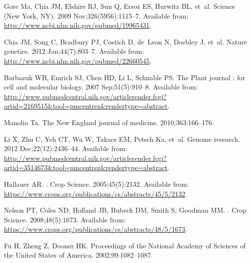 \documentclass[10pt,letterpaper]{article}
\begin{document}
\begin{thebibliography}{}
Gore Ma, Chia JM, Elshire RJ, Sun Q, Ersoz ES, Hurwitz BL, et~al.
\newblock Science (New York, NY). 2009 Nov;326(5956):1115--7.
\newblock Available from: \url{http://www.ncbi.nlm.nih.gov/pubmed/19965431}.

Chia JM, Song C, Bradbury PJ, Costich D, de~Leon N, Doebley J, et~al.
\newblock Nature genetics. 2012 Jan;44(7):803--7.
\newblock Available from: \url{http://www.ncbi.nlm.nih.gov/pubmed/22660545}.

Barbazuk WB, Emrich SJ, Chen HD, Li L, Schnable PS.
\newblock The Plant journal : for cell and molecular biology. 2007
  Sep;51(5):910--8.
\newblock Available from:
  \url{http://www.pubmedcentral.nih.gov/articlerender.fcgi?artid=2169515\&tool=pmcentrez\&rendertype=abstract}.

Manolio Ta.
\newblock The New England journal of medicine. 2010;363:166--176.

Li X, Zhu C, Yeh CT, Wu W, Takacs EM, Petsch Ka, et~al.
\newblock Genome research. 2012 Dec;22(12):2436--44.
\newblock Available from:
  \url{http://www.pubmedcentral.nih.gov/articlerender.fcgi?artid=3514673\&tool=pmcentrez\&rendertype=abstract}.

Hallauer AR.
.
\newblock Crop Science. 2005;45(5):2132.
\newblock Available from:
  \url{https://www.crops.org/publications/cs/abstracts/45/5/2132}.

Nelson PT, Coles ND, Holland JB, Bubeck DM, Smith S, Goodman MM.
.
\newblock Crop Science. 2008;48(5):1673.
\newblock Available from:
  \url{https://www.crops.org/publications/cs/abstracts/48/5/1673}.

Fu H, Zheng Z, Dooner HK.
\newblock Proceedings of the National Academy of Sciences of the United States
  of America. 2002;99:1082--1087.


\end{thebibliography}
\end{document}
